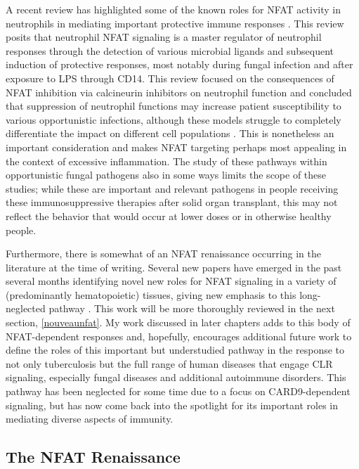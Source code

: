 A recent review has highlighted some of the known roles for NFAT activity in neutrophils in mediating important protective immune responses \citep{Vymazal2021}. This review posits that neutrophil NFAT signaling is a master regulator of neutrophil responses through the detection of various microbial ligands and subsequent induction of protective responses, most notably during fungal infection and after exposure to LPS through CD14. This review focused on the consequences of NFAT inhibition via calcineurin inhibitors on neutrophil function and concluded that suppression of neutrophil functions may increase patient susceptibility to various opportunistic infections, although these models struggle to completely differentiate the impact on different cell populations \citep{Herbst2013}. This is nonetheless an important consideration and makes NFAT targeting perhaps most appealing in the context of excessive inflammation. The study of these pathways within opportunistic fungal pathogens also in some ways limits the scope of these studies; while these are important and relevant pathogens in people receiving these immunosuppressive therapies after solid organ transplant, this may not reflect the behavior that would occur at lower doses or in otherwise healthy people.

Furthermore, there is somewhat of an NFAT renaissance occurring in the literature at the time of writing. Several new papers have emerged in the past several months identifying novel new roles for NFAT signaling in a variety of (predominantly hematopoietic) tissues, giving new emphasis to this long\hyp{}neglected pathway \citep{Deerhake2021, Poli2022, Peuker2022}. This work will be more thoroughly reviewed in the next section, \autoref{nouveaunfat}. My work discussed in later chapters adds to this body of NFAT\hyp{}dependent responses and, hopefully, encourages additional future work to define the roles of this important but understudied pathway in the response to not only tuberculosis but the full range of human diseases that engage CLR signaling, especially fungal diseases and additional autoimmune disorders. This pathway has been neglected for some time due to a focus on CARD9\hyp{}dependent signaling, but has now come back into the spotlight for its important roles in mediating diverse aspects of immunity. 

\subsection{The NFAT Renaissance}\label{nouveaunfat}

